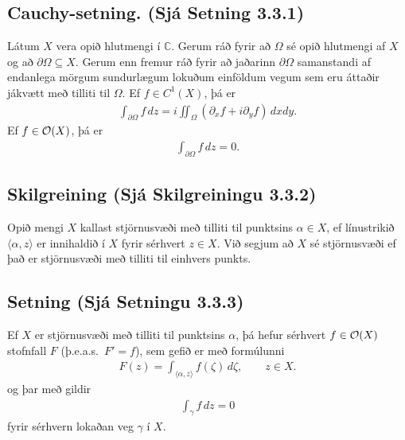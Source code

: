 \documentclass[a4paper,10pt,icelandic]{sphinxmanual}
\begin{document}
\subsection{Cauchy-setning. (Sjá Setning 3.3.1)}
\label{\detokenize{Kafli03:cauchy-setning-sja-setning-3-3-1}}
Látum \(X\) vera opið hlutmengi í \({\mathbb{C}}\). Gerum ráð fyrir að \(\Omega\) sé opið hlutmengi af \(X\) og að \(\partial \Omega\subseteq X\). Gerum enn fremur ráð fyrir að jaðarinn \(\partial \Omega\) samanstandi af endanlega mörgum sundurlægum lokuðum einföldum vegum sem eru áttaðir jákvætt með tilliti til \(\Omega\). Ef \(f\in C^1(X)\), þá er
\begin{equation*}
\begin{split}\int_{\partial\Omega}f\, dz = i\iint_\Omega
(\partial_xf+i\partial_yf)\, dxdy.\end{split}
\end{equation*}
Ef \(f\in {\cal O}(X)\), þá er
\begin{equation*}
\begin{split}\int_{\partial\Omega}f\, dz = 0.\end{split}
\end{equation*}

\subsection{Skilgreining (Sjá Skilgreiningu 3.3.2)}
\label{\detokenize{Kafli03:skilgreining-sja-skilgreiningu-3-3-2}}
Opið mengi \(X\) kallast stjörnusvæði með tilliti til punktsins \(\alpha\in X\), ef línustrikið \(\langle \alpha, z \rangle\) er innihaldið í \(X\) fyrir sérhvert \(z\in X\). Við segjum að \(X\) sé stjörnusvæði ef það er stjörnusvæði með tilliti til einhvers punkts.


\subsection{Setning (Sjá Setningu 3.3.3)}
\label{\detokenize{Kafli03:setning-sja-setningu-3-3-3}}
Ef \(X\) er stjörnusvæði með tilliti til punktsins \(\alpha\), þá hefur sérhvert \(f\in {\cal O}(X)\) stofnfall \(F\) (þ.e.a.s. \(F'=f\)), sem gefið er með formúlunni
\begin{equation*}
\begin{split}F(z)=\int_{\langle \alpha, z\rangle} f(\zeta)\, d\zeta, \qquad z\in X.\end{split}
\end{equation*}
og þar með gildir
\begin{equation*}
\begin{split}\int_\gamma f\, dz =0\end{split}
\end{equation*}
fyrir sérhvern lokaðan veg \(\gamma\) í \(X\).
\end{document}
